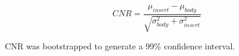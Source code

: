 

\begin{equation}
    CNR = \frac{\mu_{insert} - \mu_{body}}{\sqrt{\sigma_{body}^2 + \sigma_{insert}^2}}
\end{equation}

CNR was bootstrapped to generate a 99\% confidence interval.

